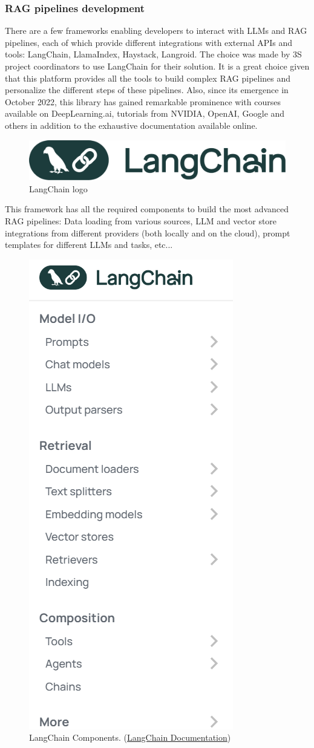 \subsubsection*{RAG pipelines development}
There are a few frameworks enabling developers to interact with LLMs and RAG pipelines, each of which provide different integrations with external APIs and tools: LangChain, LlamaIndex, Haystack, Langroid.\newline
The choice was made by 3S project coordinators to use LangChain for their solution. It is a great choice given that this platform provides all the tools to build complex RAG pipelines and personalize the different steps of these pipelines. Also, since its emergence in October 2022, this library has gained remarkable prominence with courses available on DeepLearning.ai, tutorials from NVIDIA, OpenAI, Google and others in addition to the exhaustive documentation available online.
\begin{figure}[htbp]
    \centering
    \includegraphics[width=.5\linewidth]{./figures/langchain-logo.png}
    \caption{LangChain logo}
\end{figure}\newline
This framework has all the required components to build the most advanced RAG pipelines: Data loading from various sources, LLM and vector store integrations from different providers (both locally and on the cloud), prompt templates for different LLMs and tasks, etc...
\begin{figure}[htbp]
    \centering
    \includegraphics[width=.45\linewidth]{./figures/langchain-components.png}
    \caption{LangChain Components. (\href{https://python.langchain.com/v0.1/docs/modules/}{LangChain Documentation})}
\end{figure}\newpage

